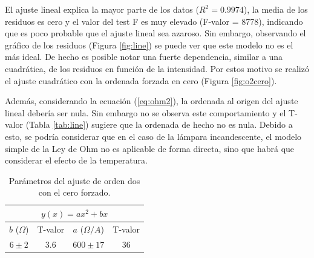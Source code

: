 \documentclass[twoside,twocolumn,a4paper]{article}
\begin{document}
El ajuste lineal explica la mayor parte de los datos ($R^2 = 0.9974$), la media de los residuos es cero y el valor del test F es muy elevado (F-valor = 8778), indicando que es poco probable que el ajuste lineal sea azaroso. Sin embargo, observando el gr\'afico de los residuos (Figura \ref{fig:line}) se puede ver que este modelo no es el m\'as ideal. De hecho es posible notar una fuerte dependencia, similar a una cuadr\'atica, de los residuos en funci\'on de la intensidad. Por estos motivo se realiz\'o el ajuste cuadr\'atico con la ordenada forzada en cero (Figura \ref{fig:o2cero}).\par
Adem\'as, considerando la ecuaci\'on (\ref{eq:ohm2}), la ordenada al origen del ajuste lineal deber\'ia ser nula. Sin embargo no se observa este comportamiento y el T-valor (Tabla \ref{tab:line}) sugiere que la ordenada de hecho no es nula. Debido a esto, se podr\'ia considerar que en el caso de la l\'ampara incandescente, el modelo simple de la Ley de Ohm no es aplicable de forma directa, sino que habr\'a que considerar el efecto de la temperatura.


\begin{table}[h]
\centering
\caption{Par\'ametros del ajuste de orden dos con el cero forzado.}
\label{tab:o20}
\begin{tabular}{|c|c|c|c|}
\hline
\multicolumn{4}{|c|}{$y(x)=ax^2+bx$}   \\ \hline
$b$ ($\Omega$)& T-valor & $a$ ($\Omega/A$) & T-valor \\ \hline
$6\pm2$	   & 3.6     & $600\pm17$    & 36     \\ \hline
\end{tabular}
\end{table}
\end{document}

